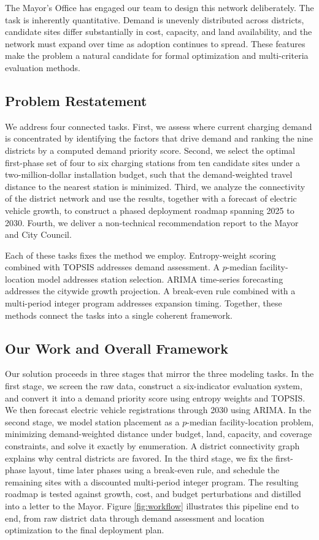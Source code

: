 \documentclass[11pt]{article}
\begin{document}
The Mayor's Office has engaged our team to design this network deliberately. The task is inherently quantitative. Demand is unevenly distributed across districts, candidate sites differ substantially in cost, capacity, and land availability, and the network must expand over time as adoption continues to spread. These features make the problem a natural candidate for formal optimization and multi-criteria evaluation methods.

\subsection{Problem Restatement}

We address four connected tasks. First, we assess where current charging demand is concentrated by identifying the factors that drive demand and ranking the nine districts by a computed demand priority score. Second, we select the optimal first-phase set of four to six charging stations from ten candidate sites under a two-million-dollar installation budget, such that the demand-weighted travel distance to the nearest station is minimized. Third, we analyze the connectivity of the district network and use the results, together with a forecast of electric vehicle growth, to construct a phased deployment roadmap spanning 2025 to 2030. Fourth, we deliver a non-technical recommendation report to the Mayor and City Council.

Each of these tasks fixes the method we employ. Entropy-weight scoring combined with TOPSIS addresses demand assessment. A $p$-median facility-location model addresses station selection. ARIMA time-series forecasting addresses the citywide growth projection. A break-even rule combined with a multi-period integer program addresses expansion timing. Together, these methods connect the tasks into a single coherent framework.

\subsection{Our Work and Overall Framework}

Our solution proceeds in three stages that mirror the three modeling tasks. In the first stage, we screen the raw data, construct a six-indicator evaluation system, and convert it into a demand priority score using entropy weights and TOPSIS. We then forecast electric vehicle registrations through 2030 using ARIMA. In the second stage, we model station placement as a $p$-median facility-location problem, minimizing demand-weighted distance under budget, land, capacity, and coverage constraints, and solve it exactly by enumeration. A district connectivity graph explains why central districts are favored. In the third stage, we fix the first-phase layout, time later phases using a break-even rule, and schedule the remaining sites with a discounted multi-period integer program. The resulting roadmap is tested against growth, cost, and budget perturbations and distilled into a letter to the Mayor. Figure \ref{fig:workflow} illustrates this pipeline end to end, from raw district data through demand assessment and location optimization to the final deployment plan.
\end{document}
